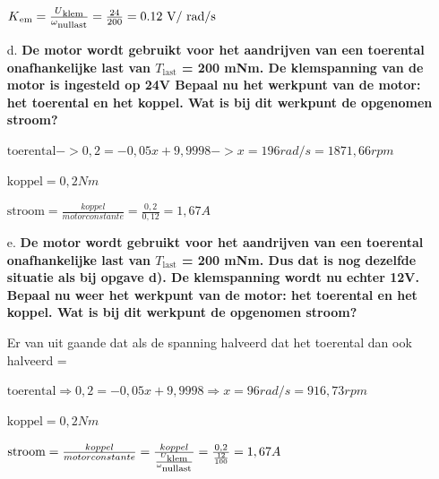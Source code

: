 \begin{enumerate}
        $K\textsubscript{em} = \frac{U\textsubscript{klem}}{\omega\textsubscript{nullast}} = \frac{24}{200} = 0.12 \text{ V/ rad/s}$

\item [d.] \textbf{De motor wordt gebruikt voor het aandrijven van een toerental onafhankelijke
    last van $T_{\text{last}}$ = 200 mNm. De klemspanning van de motor is ingesteld op 24V
    Bepaal nu het werkpunt van de motor: het toerental en het koppel. Wat is bij dit werkpunt de opgenomen stroom?}     

        $\text{toerental} -> 0,2=-0,05x + 9,9998 -> x = 196 rad/s = 1871,66 rpm $
    
        $\text{koppel} = 0,2 Nm$
        
        $\text{stroom} = \frac{koppel}{motorconstante} = \frac{0,2}{0,12} = 1,67 A$

    \item [e.] \textbf{De motor wordt gebruikt voor het aandrijven van een toerental onafhankelijke
    last van $T_{\text{last}}$ = 200 mNm. Dus dat is nog dezelfde situatie als bij opgave d).
    De klemspanning wordt nu echter 12V.
    Bepaal nu weer het werkpunt van de motor: het toerental en het koppel.
    Wat is bij dit werkpunt de opgenomen stroom?}

    Er van uit gaande dat als de spanning halveerd dat het toerental dan ook halveerd =

    $\text{toerental} \Rightarrow 0,2=-0,05x + 9,9998 \Rightarrow x = 96 rad/s = 916,73 rpm  $

    $\text{koppel} = 0,2 Nm$
    
    $\text{stroom} 
    = \frac{koppel}{motorconstante} 
    = \frac{koppel}{\frac{U\textsubscript{klem}}{\omega\textsubscript{nullast}}}
    = \frac{0,2}{\frac{12}{100}} = 1,67 A$

\end{enumerate}
